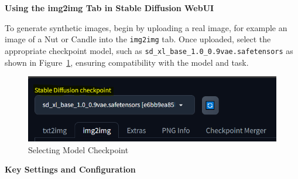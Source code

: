 \documentclass[12pt,DIV14,BCOR12mm,a4paper,footinclude=false,headinclude,parskip=half-,twoside,openright,cleardoublepage=empty,toc=index,bibliography=totoc,listof=totoc]{scrreprt}
\numberwithin{equation}{chapter}
\begin{document}
\textbf{Using the img2img Tab in Stable Diffusion WebUI}

To generate synthetic images, begin by uploading a real image, for example an image of a Nut or Candle into the \texttt{img2img} tab. Once uploaded, select the appropriate checkpoint model, such as \texttt{sd\_xl\_base\_1.0\_0.9vae.safetensors} as shown in Figure~\ref{checkpoint}, ensuring compatibility with the model and task.
\begin{figure}
	\centering
	\includegraphics[scale=.9]{../media/stable_diffusion_checkpoint.PNG}
	\caption{Selecting Model Checkpoint}
	\label{checkpoint}
\end{figure}

\textbf{Key Settings and Configuration}
\end{document}

